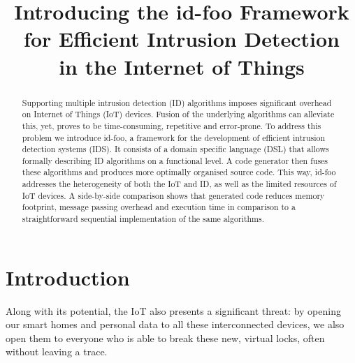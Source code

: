 \documentclass[conference]{IEEEtran}
\newcommand{\NAME}{id-foo\xspace}
\begin{document}
\expandafter\def\csname PY@tok@err\endcsname{}

\title{
Introducing the \NAME Framework\\
for Efficient Intrusion Detection\\
in the Internet of Things
}

\author{%
}

\maketitle

\begin{abstract}

Supporting multiple intrusion detection (ID) algorithms imposes significant
overhead on Internet of Things (IoT) devices. Fusion of the underlying
algorithms can alleviate this, yet, proves to be time-consuming, repetitive and
error-prone. To address this problem we introduce \NAME, a framework for the
development of efficient intrusion detection systems (IDS). It consists of a
domain specific language (DSL) that allows formally describing ID algorithms on
a functional level. A code generator then fuses these algorithms and produces
more optimally organised source code. This way, \NAME addresses the
heterogeneity of both the IoT and ID, as well as the limited resources of IoT
devices. A side-by-side comparison shows that generated code reduces memory
footprint, message passing overhead and execution time in comparison to a
straightforward sequential implementation of the same algorithms.

\end{abstract}

\section{Introduction}



Along with its potential, the IoT also presents a significant threat: by
opening our smart homes \cite{aldrich2003smart} and personal data to all these
interconnected devices, we also open them to everyone who is able to break
these new, virtual locks, often without leaving a trace.
\end{document}
